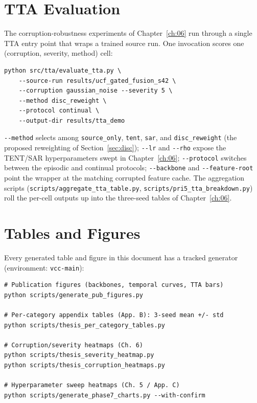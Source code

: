 \section{TTA Evaluation}
\label{sec:appe-tta}

The corruption-robustness experiments of Chapter~\ref{ch:06} run through a
single TTA entry point that wraps a trained source run. One invocation scores
one (corruption, severity, method) cell:

\begin{verbatim}
python src/tta/evaluate_tta.py \
    --source-run results/ucf_gated_fusion_s42 \
    --corruption gaussian_noise --severity 5 \
    --method disc_reweight \
    --protocol continual \
    --output-dir results/tta_demo
\end{verbatim}

\texttt{-{}-method} selects among \texttt{source\_only}, \texttt{tent},
\texttt{sar}, and \texttt{disc\_reweight} (the proposed reweighting of
Section~\ref{sec:disc}); \texttt{-{}-lr} and \texttt{-{}-rho} expose the
TENT/SAR hyperparameters swept in Chapter~\ref{ch:06};
\texttt{-{}-protocol} switches between the episodic and continual protocols;
\texttt{-{}-backbone} and \texttt{-{}-feature-root} point the wrapper at the
matching corrupted feature cache. The aggregation scripts
(\texttt{scripts/aggregate\_tta\_table.py},
\texttt{scripts/pri5\_tta\_breakdown.py}) roll the per-cell outputs up into
the three-seed tables of Chapter~\ref{ch:06}.

\section{Tables and Figures}
\label{sec:appe-figures}

Every generated table and figure in this document has a tracked generator
(environment: \texttt{vcc-main}):

\begin{verbatim}
# Publication figures (backbones, temporal curves, TTA bars)
python scripts/generate_pub_figures.py

# Per-category appendix tables (App. B): 3-seed mean +/- std
python scripts/thesis_per_category_tables.py

# Corruption/severity heatmaps (Ch. 6)
python scripts/thesis_severity_heatmap.py
python scripts/thesis_corruption_heatmaps.py

# Hyperparameter sweep heatmaps (Ch. 5 / App. C)
python scripts/generate_phase7_charts.py --with-confirm
\end{verbatim}

